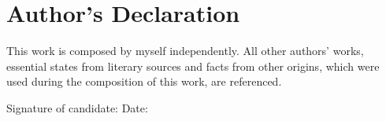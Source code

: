 \clearpage\vspace*{\fill}

\section*{Author’s Declaration} 


This work is composed by myself independently. All other authors' works, essential
states from literary sources and facts from other origins, which were used during the
composition of this work, are referenced.

\vspace{7em}
Signature of candidate: \hspace{10em}Date:

\vspace{\fill}
\clearpage


